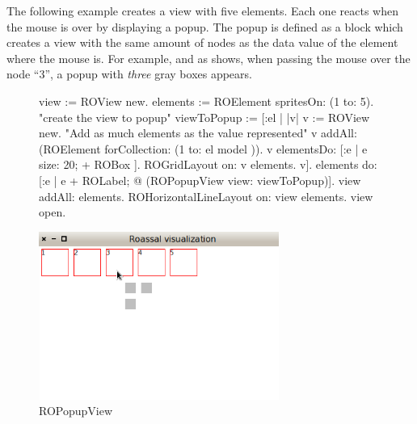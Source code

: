 \documentclass[a4paper,10pt,twoside]{book}
\begin{document}
The following example creates a view with five elements. Each one reacts when the mouse is over by displaying a popup. The popup is defined as a block which creates a view with the same amount of nodes as the data value of the element where the mouse is. For example, and as  shows, when passing the mouse over the node ``3'', a popup with \textit{three} gray boxes appears.

\begin{figure}[H]
      \begin{minipage}[t]{1\textwidth}
      \vspace{0pt}
     \begin{code}{}
view := ROView new.
elements := ROElement spritesOn: (1 to: 5).
"create the view to popup"
viewToPopup :=
	[:el |
		|v| 
		v := ROView new.
		"Add as much elements as the value represented"
		v addAll: (ROElement forCollection: (1 to: el model )).
		v elementsDo: [:e | e size: 20; + ROBox ].
		ROGridLayout on: v elements.
		v].
elements 
	do: [:e | e + ROLabel; 
				@ (ROPopupView view: viewToPopup)].
view addAll: elements.
ROHorizontalLineLayout on: view elements.
view open.
  \end{code}
   \end{minipage}
   \hfill
   \begin{minipage}[t]{1\textwidth}
	 \vspace{0pt} \raggedright
       \centering
		\includegraphics[width=0.7\textwidth]{popupView2}
   \end{minipage}
\label{fig:popupView}
\caption{ROPopupView}
\end{figure} 


%
%	
\end{document}
